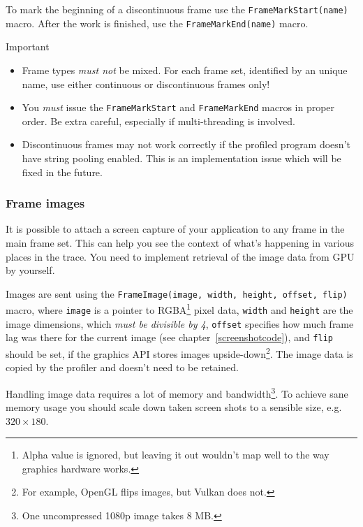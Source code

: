 \documentclass[hidelinks,titlepage,a4paper]{article}
\begin{document}
To mark the beginning of a discontinuous frame use the \texttt{FrameMarkStart(name)} macro. After the work is finished, use the \texttt{FrameMarkEnd(name)} macro.

\begin{bclogo}[
noborder=true,
couleur=black!5,
logo=\bcbombe
]{Important}
\begin{itemize}
\item Frame types \emph{must not} be mixed. For each frame set, identified by an unique name, use either continuous or discontinuous frames only!
\item You \emph{must} issue the \texttt{FrameMarkStart} and \texttt{FrameMarkEnd} macros in proper order. Be extra careful, especially if multi-threading is involved.
\item Discontinuous frames may not work correctly if the profiled program doesn't have string pooling enabled. This is an implementation issue which will be fixed in the future.
\end{itemize}
\end{bclogo}

\subsubsection{Frame images}
\label{frameimages}

It is possible to attach a screen capture of your application to any frame in the main frame set. This can help you see the context of what's happening in various places in the trace. You need to implement retrieval of the image data from GPU by yourself.

Images are sent using the \texttt{FrameImage(image, width, height, offset, flip)} macro, where \texttt{image} is a pointer to RGBA\footnote{Alpha value is ignored, but leaving it out wouldn't map well to the way graphics hardware works.} pixel data, \texttt{width} and \texttt{height} are the image dimensions, which \emph{must be divisible by 4}, \texttt{offset} specifies how much frame lag was there for the current image (see chapter~\ref{screenshotcode}), and \texttt{flip} should be set, if the graphics API stores images upside-down\footnote{For example, OpenGL flips images, but Vulkan does not.}. The image data is copied by the profiler and doesn't need to be retained.

Handling image data requires a lot of memory and bandwidth\footnote{One uncompressed 1080p image takes 8 MB.}. To achieve sane memory usage you should scale down taken screen shots to a sensible size, e.g. $320\times180$.
\end{document}
